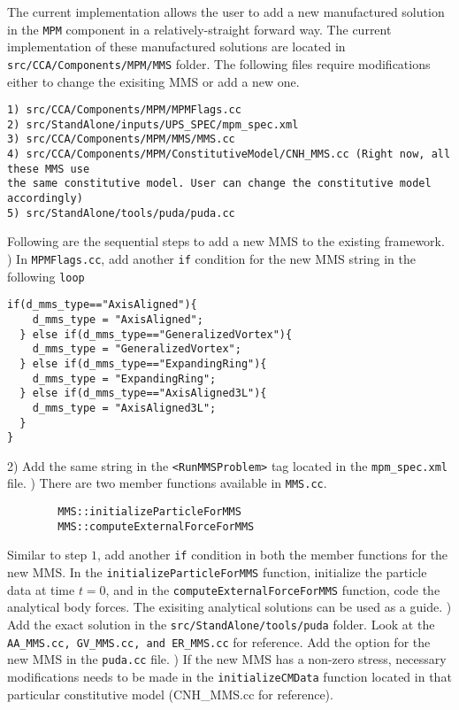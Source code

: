 The current implementation allows the user to add a new manufactured solution in the {\tt MPM} component in a relatively-straight forward way. The current implementation of these manufactured solutions are located in {\tt src/CCA/Components/MPM/MMS} folder.
The following files require modifications either to change the exisiting MMS or add a new one.
\begin{verbatim}
1) src/CCA/Components/MPM/MPMFlags.cc
2) src/StandAlone/inputs/UPS_SPEC/mpm_spec.xml
3) src/CCA/Components/MPM/MMS/MMS.cc
4) src/CCA/Components/MPM/ConstitutiveModel/CNH_MMS.cc (Right now, all these MMS use
the same constitutive model. User can change the constitutive model accordingly)
5) src/StandAlone/tools/puda/puda.cc
\end{verbatim}
Following are the sequential steps to add a new MMS to the existing framework. 
) In {\tt MPMFlags.cc}, add another {\tt if} condition for the new MMS string in the following {\tt loop}
\begin{verbatim}
if(d_mms_type=="AxisAligned"){
    d_mms_type = "AxisAligned";
  } else if(d_mms_type=="GeneralizedVortex"){
    d_mms_type = "GeneralizedVortex";
  } else if(d_mms_type=="ExpandingRing"){
    d_mms_type = "ExpandingRing";
  } else if(d_mms_type=="AxisAligned3L"){
    d_mms_type = "AxisAligned3L";
  }
}
\end{verbatim}
2) Add the same string in the {\tt <RunMMSProblem>} tag located in the {\tt mpm\_spec.xml} file.
) There are two member functions available in {\tt MMS.cc}.
\begin{verbatim}
		MMS::initializeParticleForMMS
		MMS::computeExternalForceForMMS
\end{verbatim}
Similar to step $1$, add another {\tt if} condition in both the member functions for the new MMS. In the {\tt initializeParticleForMMS} function, initialize the particle data at time $t=0$, and in the {\tt computeExternalForceForMMS} function, code the analytical body forces. The exisiting analytical solutions can be used as a guide.
) Add the exact solution in the {\tt src/StandAlone/tools/puda} folder. Look at the {\tt AA\_MMS.cc, GV\_MMS.cc, and ER\_MMS.cc} for reference. Add the option for the new MMS in the {\tt puda.cc} file.
) If the new MMS has a non-zero stress, necessary modifications needs to be made in the {\tt initializeCMData} function located in that particular constitutive model (CNH\_MMS.cc for reference).



